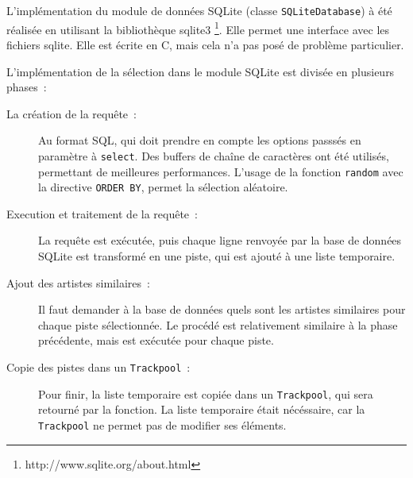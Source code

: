 L’implémentation du module de données SQLite (classe \texttt{SQLiteDatabase})
à été réalisée en utilisant la bibliothèque sqlite3
\footnote{http://www.sqlite.org/about.html}. Elle permet une interface avec les
fichiers sqlite. Elle est écrite en C, mais cela n'a pas posé de problème
particulier.

L’implémentation de la sélection dans le module SQLite est divisée en plusieurs
phases~:
\begin{description}
  \item[La création de la requête~:] Au format SQL, qui doit prendre en compte
  les options passsés en paramètre à \texttt{select}. Des buffers de chaîne de
  caractères ont été utilisés, permettant de meilleures performances. L'usage de
  la fonction \texttt{random} avec la directive \texttt{ORDER BY}, permet la
  sélection aléatoire.

  \item[Execution et traitement de la requête~:] La requête est exécutée, puis
  chaque ligne renvoyée par la base de données SQLite est transformé en une
  piste, qui est ajouté à une liste temporaire.

  \item[Ajout des artistes similaires~:] Il faut demander à la base de données
  quels sont les artistes similaires pour chaque piste sélectionnée. Le procédé
  est relativement similaire à la phase précédente, mais est exécutée pour
  chaque piste.

  \item[Copie des pistes dans un \texttt{Trackpool}~:] Pour finir, la liste
  temporaire est copiée dans un \texttt{Trackpool}, qui sera retourné par la
  fonction. La liste temporaire était nécéssaire, car la \texttt{Trackpool} ne
  permet pas de modifier ses éléments.
\end{description}